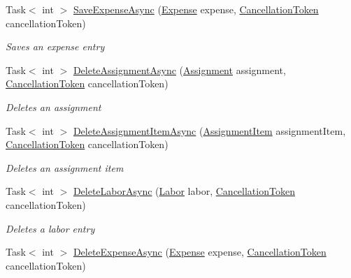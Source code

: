 \begin{DoxyCompactItemize}
Task$<$ int $>$ \hyperlink{class_field_service_1_1_tests_1_1_mocks_1_1_mock_assignment_service_a7fcd8ae38940b504ebceaf035fa10036}{Save\+Expense\+Async} (\hyperlink{class_field_service_1_1_data_1_1_expense}{Expense} expense, \hyperlink{_view_models_2_assignment_view_model_8cs_aba80ec766846c61f55644fd23860cb18}{Cancellation\+Token} cancellation\+Token)
\begin{DoxyCompactList}\small\item\em Saves an expense entry \end{DoxyCompactList}\item 
Task$<$ int $>$ \hyperlink{class_field_service_1_1_tests_1_1_mocks_1_1_mock_assignment_service_a9dd8d2d8d85c91f2b38f50ad07d2fc1e}{Delete\+Assignment\+Async} (\hyperlink{class_field_service_1_1_data_1_1_assignment}{Assignment} assignment, \hyperlink{_view_models_2_assignment_view_model_8cs_aba80ec766846c61f55644fd23860cb18}{Cancellation\+Token} cancellation\+Token)
\begin{DoxyCompactList}\small\item\em Deletes an assignment \end{DoxyCompactList}\item 
Task$<$ int $>$ \hyperlink{class_field_service_1_1_tests_1_1_mocks_1_1_mock_assignment_service_a9985729aec2e1a3095a1cbf49b984f96}{Delete\+Assignment\+Item\+Async} (\hyperlink{class_field_service_1_1_data_1_1_assignment_item}{Assignment\+Item} assignment\+Item, \hyperlink{_view_models_2_assignment_view_model_8cs_aba80ec766846c61f55644fd23860cb18}{Cancellation\+Token} cancellation\+Token)
\begin{DoxyCompactList}\small\item\em Deletes an assignment item \end{DoxyCompactList}\item 
Task$<$ int $>$ \hyperlink{class_field_service_1_1_tests_1_1_mocks_1_1_mock_assignment_service_a158f68336644c72064217c6d90b7c23b}{Delete\+Labor\+Async} (\hyperlink{class_field_service_1_1_data_1_1_labor}{Labor} labor, \hyperlink{_view_models_2_assignment_view_model_8cs_aba80ec766846c61f55644fd23860cb18}{Cancellation\+Token} cancellation\+Token)
\begin{DoxyCompactList}\small\item\em Deletes a labor entry \end{DoxyCompactList}\item 
Task$<$ int $>$ \hyperlink{class_field_service_1_1_tests_1_1_mocks_1_1_mock_assignment_service_a0739fef17cd37e0e5973c5ee25e6cdc8}{Delete\+Expense\+Async} (\hyperlink{class_field_service_1_1_data_1_1_expense}{Expense} expense, \hyperlink{_view_models_2_assignment_view_model_8cs_aba80ec766846c61f55644fd23860cb18}{Cancellation\+Token} cancellation\+Token)

\end{DoxyCompactItemize}
